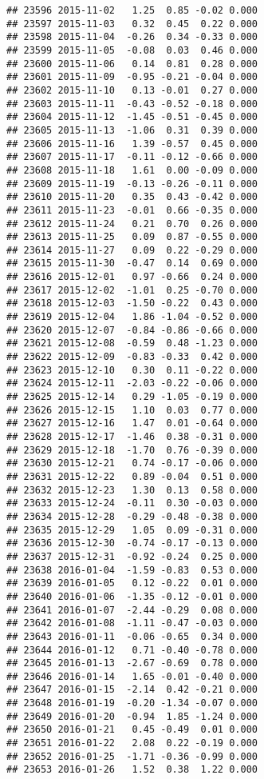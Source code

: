 \documentclass[
]{article}
\begin{document}
\begin{verbatim}
## 23596 2015-11-02   1.25  0.85 -0.02 0.000
## 23597 2015-11-03   0.32  0.45  0.22 0.000
## 23598 2015-11-04  -0.26  0.34 -0.33 0.000
## 23599 2015-11-05  -0.08  0.03  0.46 0.000
## 23600 2015-11-06   0.14  0.81  0.28 0.000
## 23601 2015-11-09  -0.95 -0.21 -0.04 0.000
## 23602 2015-11-10   0.13 -0.01  0.27 0.000
## 23603 2015-11-11  -0.43 -0.52 -0.18 0.000
## 23604 2015-11-12  -1.45 -0.51 -0.45 0.000
## 23605 2015-11-13  -1.06  0.31  0.39 0.000
## 23606 2015-11-16   1.39 -0.57  0.45 0.000
## 23607 2015-11-17  -0.11 -0.12 -0.66 0.000
## 23608 2015-11-18   1.61  0.00 -0.09 0.000
## 23609 2015-11-19  -0.13 -0.26 -0.11 0.000
## 23610 2015-11-20   0.35  0.43 -0.42 0.000
## 23611 2015-11-23  -0.01  0.66 -0.35 0.000
## 23612 2015-11-24   0.21  0.70  0.26 0.000
## 23613 2015-11-25   0.09  0.87 -0.55 0.000
## 23614 2015-11-27   0.09  0.22 -0.29 0.000
## 23615 2015-11-30  -0.47  0.14  0.69 0.000
## 23616 2015-12-01   0.97 -0.66  0.24 0.000
## 23617 2015-12-02  -1.01  0.25 -0.70 0.000
## 23618 2015-12-03  -1.50 -0.22  0.43 0.000
## 23619 2015-12-04   1.86 -1.04 -0.52 0.000
## 23620 2015-12-07  -0.84 -0.86 -0.66 0.000
## 23621 2015-12-08  -0.59  0.48 -1.23 0.000
## 23622 2015-12-09  -0.83 -0.33  0.42 0.000
## 23623 2015-12-10   0.30  0.11 -0.22 0.000
## 23624 2015-12-11  -2.03 -0.22 -0.06 0.000
## 23625 2015-12-14   0.29 -1.05 -0.19 0.000
## 23626 2015-12-15   1.10  0.03  0.77 0.000
## 23627 2015-12-16   1.47  0.01 -0.64 0.000
## 23628 2015-12-17  -1.46  0.38 -0.31 0.000
## 23629 2015-12-18  -1.70  0.76 -0.39 0.000
## 23630 2015-12-21   0.74 -0.17 -0.06 0.000
## 23631 2015-12-22   0.89 -0.04  0.51 0.000
## 23632 2015-12-23   1.30  0.13  0.58 0.000
## 23633 2015-12-24  -0.11  0.30 -0.03 0.000
## 23634 2015-12-28  -0.29 -0.48 -0.38 0.000
## 23635 2015-12-29   1.05  0.09 -0.31 0.000
## 23636 2015-12-30  -0.74 -0.17 -0.13 0.000
## 23637 2015-12-31  -0.92 -0.24  0.25 0.000
## 23638 2016-01-04  -1.59 -0.83  0.53 0.000
## 23639 2016-01-05   0.12 -0.22  0.01 0.000
## 23640 2016-01-06  -1.35 -0.12 -0.01 0.000
## 23641 2016-01-07  -2.44 -0.29  0.08 0.000
## 23642 2016-01-08  -1.11 -0.47 -0.03 0.000
## 23643 2016-01-11  -0.06 -0.65  0.34 0.000
## 23644 2016-01-12   0.71 -0.40 -0.78 0.000
## 23645 2016-01-13  -2.67 -0.69  0.78 0.000
## 23646 2016-01-14   1.65 -0.01 -0.40 0.000
## 23647 2016-01-15  -2.14  0.42 -0.21 0.000
## 23648 2016-01-19  -0.20 -1.34 -0.07 0.000
## 23649 2016-01-20  -0.94  1.85 -1.24 0.000
## 23650 2016-01-21   0.45 -0.49  0.01 0.000
## 23651 2016-01-22   2.08  0.22 -0.19 0.000
## 23652 2016-01-25  -1.71 -0.36 -0.99 0.000
## 23653 2016-01-26   1.52  0.38  1.22 0.000

\end{verbatim}
\end{document}
